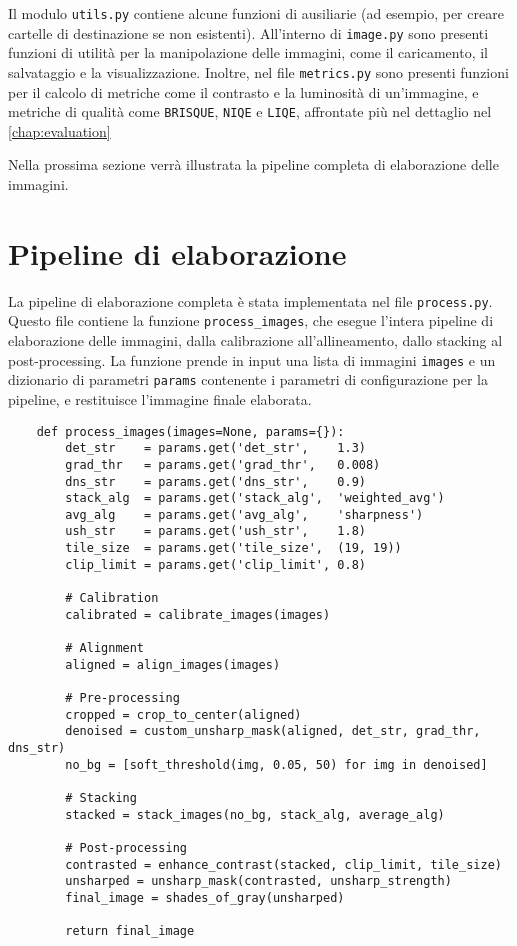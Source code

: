 Il modulo \texttt{utils.py} contiene alcune funzioni di ausiliarie (ad esempio, per creare cartelle di destinazione se non esistenti). All'interno di \texttt{image.py} sono presenti funzioni di utilità per la manipolazione delle immagini, come il caricamento, il salvataggio e la visualizzazione. Inoltre, nel file \texttt{metrics.py} sono presenti funzioni per il calcolo di metriche come il contrasto e la luminosità di un'immagine, e metriche di qualità come \texttt{BRISQUE}, \texttt{NIQE} e \texttt{LIQE}, affrontate più nel dettaglio nel \cref{chap:evaluation}

Nella prossima sezione verrà illustrata la pipeline completa di elaborazione delle immagini.

\section{Pipeline di elaborazione} \label{sec:pipeline_impl}

La pipeline di elaborazione completa è stata implementata nel file \texttt{process.py}. Questo file contiene la funzione \texttt{process\_images}, che esegue l'intera pipeline di elaborazione delle immagini, dalla calibrazione all'allineamento, dallo stacking al post-processing. La funzione prende in input una lista di immagini \texttt{images} e un dizionario di parametri \texttt{params} contenente i parametri di configurazione per la pipeline, e restituisce l'immagine finale elaborata.

\begin{lstlisting}
    def process_images(images=None, params={}):
        det_str    = params.get('det_str',    1.3)
        grad_thr   = params.get('grad_thr',   0.008)
        dns_str    = params.get('dns_str',    0.9)
        stack_alg  = params.get('stack_alg',  'weighted_avg')
        avg_alg    = params.get('avg_alg',    'sharpness')
        ush_str    = params.get('ush_str',    1.8)
        tile_size  = params.get('tile_size',  (19, 19))
        clip_limit = params.get('clip_limit', 0.8)

        # Calibration
        calibrated = calibrate_images(images)

        # Alignment 
        aligned = align_images(images)

        # Pre-processing
        cropped = crop_to_center(aligned)
        denoised = custom_unsharp_mask(aligned, det_str, grad_thr, dns_str)
        no_bg = [soft_threshold(img, 0.05, 50) for img in denoised]

        # Stacking
        stacked = stack_images(no_bg, stack_alg, average_alg)

        # Post-processing
        contrasted = enhance_contrast(stacked, clip_limit, tile_size)
        unsharped = unsharp_mask(contrasted, unsharp_strength)
        final_image = shades_of_gray(unsharped)
        
        return final_image
\end{lstlisting}

